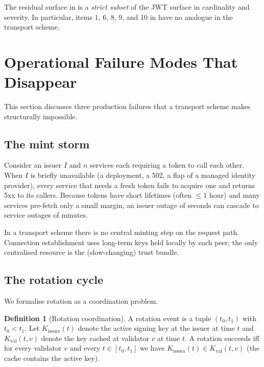 \documentclass[11pt,a4paper]{article}
\theoremstyle{plain}
\theoremstyle{definition}
\newtheorem{definition}[theorem]{Definition}
\begin{document}
The residual surface in  is a \emph{strict subset} of the
JWT surface in cardinality and severity. In particular, items 1, 6, 8, 9,
and 10 in  have no analogue in the transport scheme.

\section{Operational Failure Modes That Disappear}
\label{sec:opfail}

This section discusses three production failures that a transport scheme
makes structurally impossible.

\subsection{The mint storm}
\label{sec:mintstorm}

Consider an issuer $I$ and $n$ services each requiring a token to call
each other. When $I$ is briefly unavailable (a deployment, a 502, a flap
of a managed identity provider), every service that needs a fresh token
fails to acquire one and returns 5xx to its callers. Because tokens have
short lifetimes (often $\le 1$ hour) and many services pre-fetch only a
small margin, an issuer outage of seconds can cascade to service
outages of minutes.

In a transport scheme there is no central minting step on the request
path. Connection establishment uses long-term keys held locally by each
peer; the only centralised resource is the (slow-changing) trust bundle.

\subsection{The rotation cycle}
\label{sec:rotation}

We formalise rotation as a coordination problem.

\begin{definition}[Rotation coordination]
\label{def:rotation}
A rotation event is a tuple $(t_0, t_1)$ with $t_0 < t_1$. Let
$K_{\text{issuer}}(t)$ denote the active signing key at the issuer at time
$t$ and $K_{\text{val}}(t,v)$ denote the key cached at validator $v$ at time
$t$. A rotation succeeds iff for every validator $v$ and every $t \in [t_0,
t_1]$ we have $K_{\text{issuer}}(t) \in K_{\text{val}}(t,v)$ (the cache
contains the active key).
\end{definition}
\end{document}
